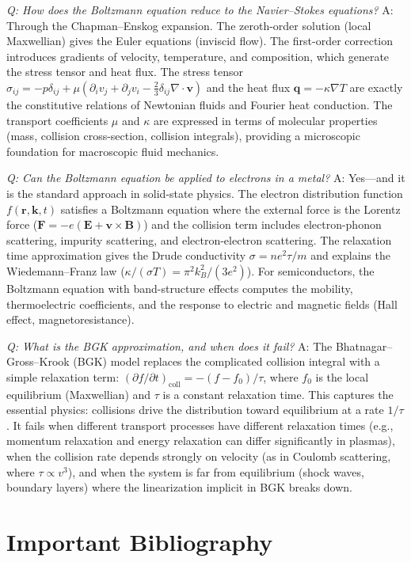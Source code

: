 \documentclass[11pt,openright]{book}
\begin{document}
\textit{Q: How does the Boltzmann equation reduce to the Navier--Stokes equations?}
A: Through the Chapman--Enskog expansion. The zeroth-order solution (local Maxwellian) gives the Euler equations (inviscid flow). The first-order correction introduces gradients of velocity, temperature, and composition, which generate the stress tensor and heat flux. The stress tensor $\sigma_{ij} = -p\delta_{ij} + \mu(\partial_i v_j + \partial_j v_i - \frac{2}{3}\delta_{ij}\nabla\cdot\mathbf{v})$ and the heat flux $\mathbf{q} = -\kappa\nabla T$ are exactly the constitutive relations of Newtonian fluids and Fourier heat conduction. The transport coefficients $\mu$ and $\kappa$ are expressed in terms of molecular properties (mass, collision cross-section, collision integrals), providing a microscopic foundation for macroscopic fluid mechanics.

\textit{Q: Can the Boltzmann equation be applied to electrons in a metal?}
A: Yes---and it is the standard approach in solid-state physics. The electron distribution function $f(\mathbf{r}, \mathbf{k}, t)$ satisfies a Boltzmann equation where the external force is the Lorentz force ($\mathbf{F} = -e(\mathbf{E} + \mathbf{v}\times\mathbf{B})$) and the collision term includes electron-phonon scattering, impurity scattering, and electron-electron scattering. The relaxation time approximation gives the Drude conductivity $\sigma = ne^2\tau/m$ and explains the Wiedemann--Franz law ($\kappa/(\sigma T) = \pi^2 k_B^2/(3e^2)$). For semiconductors, the Boltzmann equation with band-structure effects computes the mobility, thermoelectric coefficients, and the response to electric and magnetic fields (Hall effect, magnetoresistance).

\textit{Q: What is the BGK approximation, and when does it fail?}
A: The Bhatnagar--Gross--Krook (BGK) model replaces the complicated collision integral with a simple relaxation term: $(\partial f/\partial t)_{\text{coll}} = -(f - f_0)/\tau$, where $f_0$ is the local equilibrium (Maxwellian) and $\tau$ is a constant relaxation time. This captures the essential physics: collisions drive the distribution toward equilibrium at a rate $1/\tau$. It fails when different transport processes have different relaxation times (e.g., momentum relaxation and energy relaxation can differ significantly in plasmas), when the collision rate depends strongly on velocity (as in Coulomb scattering, where $\tau \propto v^3$), and when the system is far from equilibrium (shock waves, boundary layers) where the linearization implicit in BGK breaks down.
\section*{Important Bibliography}
\end{document}
